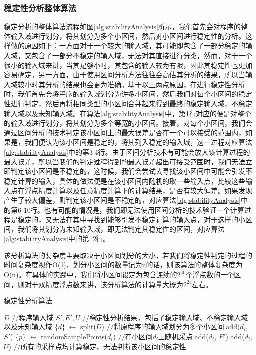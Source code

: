 \subsubsection{稳定性分析整体算法}

稳定分析的整体算法流程如图\ref{alg:stabilityAnalysis}所示，我们首先会对程序的整体输入域进行划分，将其划分为多个小区间，然后对小区间进行稳定性的分析。这样做的原因如下：一方面对于一个较大的输入域，其可能即包含了一部分稳定的输入域，又包含了一部分不稳定的输入域，无法对其直接进行分类，然而，对于一个很小的输入域来讲，当其足够小时，其包含的输入较为有限，因此其稳定性也更加容易确定。另一方面，由于使用区间分析方法往往会高估其分析的结果，所以当输入域较小时其分析的结果也会更为准确。基于以上两点原因，在进行稳定性分析时，我们首先会将程序的输入域划分为许多小区间，然后我们对每个小区间的稳定性进行判定，然后再将相同类型的小区间合并起来得到最终的稳定输入域，不稳定输入域以及未知输入域。在算法\ref{alg:stabilityAnalysis}中，第1行对应的便是对整个的输入域进行划分，将其划分为多个等宽的小区间。接着，对每个小区间，我们会通过区间分析的技术判定该小区间上的最大误差是否在一个可以接受的范围内，如果是，我们便认为该小区间是稳定的，将其列入稳定的输入域，这一过程对应算法\ref{alg:stabilityAnalysis}中的第3-4行。由于区间分析技术有可能会放大该计算过程的最大误差，所以当我们的判定过程得到的最大误差超出可接受范围时，我们无法立即判定该小区间是不稳定的，这时候，我们会尝试去寻找该小区间中可能会引发不稳定计算的输入，具体的做法便是在该小区间内随机的取一些输入点，比较这些输入点在浮点精度计算以及任意精度计算下的计算结果，是否有较大偏差。如果发现产生了较大偏差，则判定该小区间是不稳定的，对应算法\ref{alg:stabilityAnalysis}中的第6-10行。也有可能的情况是，我们即无法使用区间分析的技术验证一个计算过程是稳定的，又无法在其中寻找到能够引发不稳定计算的输入点，对于这样的小区间，我们将其划分为未知输入域，即无法判定其稳定性的区间，对应算法\ref{alg:stabilityAnalysis}中的第12行。

该分析算法的复杂度主要取决于小区间划分的大小，若我们将稳定性判定的过程的时间复杂度视作O(1)，划分小区间的数量记为n的话，则该算法的整体复杂度为O(n)。在具体的实践中，我们将小区间设定为包含连续的$2^{40}$个浮点数的一个区间，则对于双精度浮点数来讲，该分析算法的计算量大概为$2^{24}$左右。

\begin{algorithm}[thb]
  \caption{稳定性分析算法}
  \label{alg:stabilityAnalysis}
\begin{algorithmic}[1]
\REQUIRE $D$ {{\footnotesize$//$}\small 程序输入域}
\ENSURE $S', E', U$ {{\footnotesize$//$}\small 稳定性分析结果，包括了稳定输入域、不稳定输入域以及未知输入域}
\STATE $\{ d \}$ $\leftarrow$ split($D$) {{\footnotesize$//$}\small 将原程序的输入域划分为多个小区间}
\STATE add($d_i$, $S'$)
\ELSE
\STATE $\{ p \}$ $\leftarrow$ randomSamplePoints($d_i$) {{\footnotesize$//$}\small 在小区间$d_i$上随机采点}
\STATE add($d_i$, $E'$)
\ENDIF
\ENDFOR
\STATE add($d_i$,$U$) {{\footnotesize$//$}\small 所有的采样点均计算稳定，无法判断该小区间的稳定性}
\ENDIF
\ENDFOR
\end{algorithmic}
\end{algorithm}

